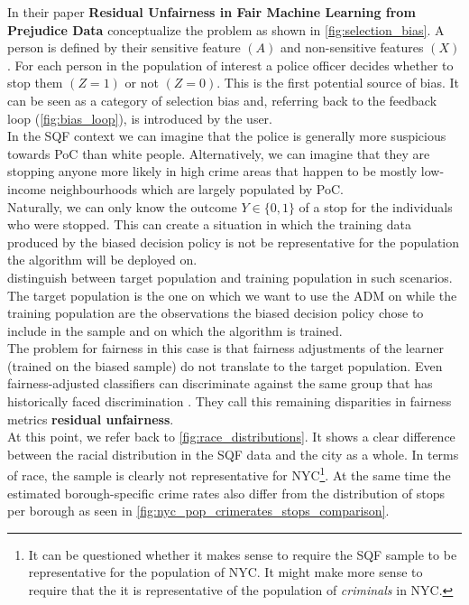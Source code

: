 In their paper \textbf{Residual Unfairness in Fair Machine Learning from Prejudice Data} \cite{kallus2018} conceptualize the problem as shown in \autoref{fig:selection_bias}.
A person is defined by their sensitive feature $(A)$ and non-sensitive features $(X)$. For each person in the population of interest a police officer decides whether to stop them $(Z = 1)$ or not $(Z = 0)$. This is the first potential source of bias. It can be seen as a category of selection bias and, referring back to the feedback loop (\autoref{fig:bias_loop}), is introduced by the user.\\
In the SQF context we can imagine that the police is generally more suspicious towards PoC than white people. Alternatively, we can imagine that they are stopping anyone more likely in high crime areas that happen to be mostly low-income neighbourhoods which are largely populated by PoC. \\
Naturally, we can only know the outcome $Y \in \{0, 1\}$ of a stop for the individuals who were stopped. This can create a situation in which the training data produced by the biased decision policy is not be representative for the population the algorithm will be deployed on.\\
\cite{kallus2018} distinguish between target population and training population in such scenarios. The target population is the one on which we want to use the ADM on while the training population are the observations the biased decision policy chose to include in the sample and on which the algorithm is trained.\\
The problem for fairness in this case is that fairness adjustments of the learner (trained on the biased sample) do not translate to the target population. Even fairness-adjusted classifiers can discriminate against the same group that has historically faced discrimination \cite{kallus2018}. They call this remaining disparities in fairness metrics \textbf{residual unfairness}.\\
At this point, we refer back to \autoref{fig:race_distributions}. It shows a clear difference between the racial distribution in the SQF data and the city as a whole. In terms of race, the sample is clearly not representative for NYC\footnote{It can be questioned whether it makes sense to require the SQF sample to be representative for the population of NYC. It might make more sense to require that the it is representative of the population of \textit{criminals} in NYC.}. At the same time the estimated borough-specific crime rates also differ from the distribution of stops per borough as seen in \autoref{fig:nyc_pop_crimerates_stops_comparison}. \\
